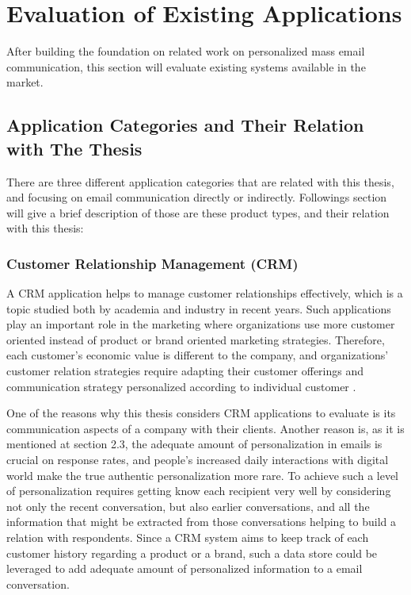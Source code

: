 \chapter{Evaluation of Existing Applications}
\label{chp:3:EvalExisAppl}
After building the foundation on related work on personalized mass email communication, this section will evaluate existing systems available in the market. 

\section{Application Categories and Their Relation with The Thesis}
\label{sec:3.1:SystCate}

There are three different application categories that are related with this thesis, and focusing on email communication directly or indirectly. Followings section will give a brief description of those are these product types, and their relation with this thesis:

\subsection{Customer Relationship Management (CRM)}
\label{subsec:3.1.1:Cust}
A \ac{CRM} application helps to manage customer relationships effectively, which is a topic studied both by academia and industry in recent years. Such applications play an important role in the marketing where organizations use more customer oriented instead of product or brand oriented marketing strategies. Therefore, each customer's economic value is different to the company, and organizations' customer relation strategies require adapting their customer offerings and communication strategy personalized according to individual customer \citep{Reinartz2004}. 
\vspace{1cm}

One of the reasons why this thesis considers \ac{CRM} applications to evaluate is its communication aspects of a company with their clients. Another reason is, as it is mentioned at section 2.3, the adequate amount of personalization in emails is crucial on response rates, and people's increased daily interactions with digital world make the true authentic personalization more rare. To achieve such a level of personalization requires getting know each recipient very well by considering not only the recent conversation, but also earlier conversations, and all the information that might be extracted from those conversations helping to build a relation with respondents. Since a \ac{CRM} system aims to keep track of each customer history regarding a product or a brand, such a data store could be leveraged to add adequate amount of personalized information to a email conversation. 


